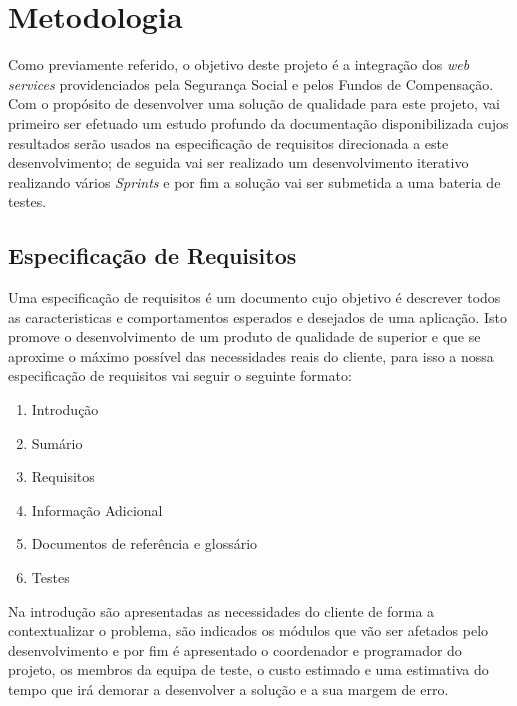 \documentclass[sigplan]{acmart}
\begin{document}
\section{Metodologia} \label{sec:methods}

Como previamente referido, o objetivo deste projeto é a integração dos \textit{web services} providenciados pela Segurança Social e pelos Fundos de Compensação. Com o propósito de desenvolver uma solução de qualidade para este projeto, vai primeiro ser efetuado um estudo profundo da documentação disponibilizada cujos resultados serão usados na especificação de requisitos direcionada a este desenvolvimento; de seguida vai ser realizado um desenvolvimento iterativo realizando vários \textit{Sprints} e por fim a solução vai ser submetida a uma bateria de testes.

\subsection{Especificação de Requisitos}

Uma especificação de requisitos é um documento cujo objetivo é descrever todos as caracteristicas e comportamentos esperados e desejados de uma aplicação\cite{SRS}. Isto promove o desenvolvimento de um produto de qualidade de superior e que se aproxime o máximo possível das necessidades reais do cliente, para isso a nossa especificação de requisitos vai seguir o seguinte formato:
\begin{enumerate}
  \item Introdução
  \item Sumário
  \item Requisitos
  \item Informação Adicional
  \item Documentos de referência e glossário
  \item Testes
\end{enumerate}
Na introdução são apresentadas as necessidades do cliente de forma a contextualizar o problema, são indicados os módulos que vão ser afetados pelo desenvolvimento e por fim é apresentado o coordenador e programador do projeto, os membros da equipa de teste, o custo estimado e uma estimativa do tempo que irá demorar a desenvolver a solução e a sua margem de erro.
\end{document}
